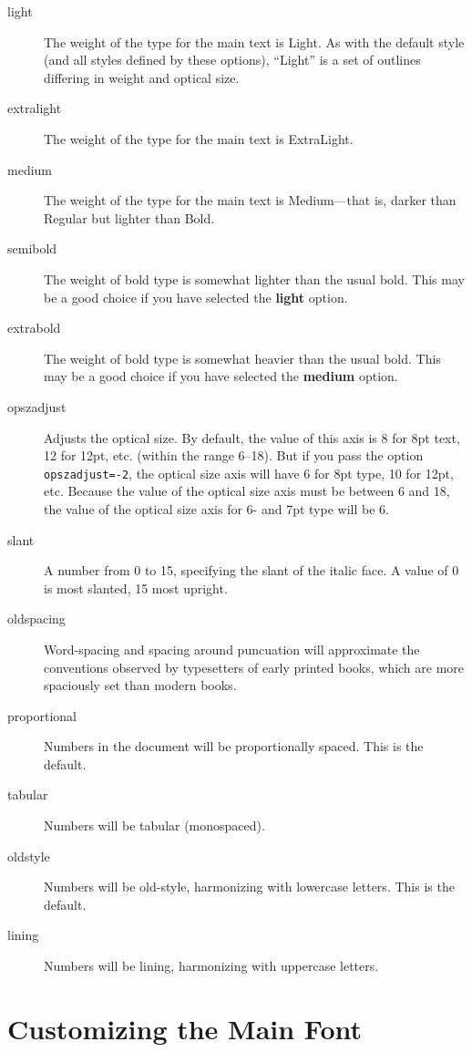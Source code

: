 \documentclass[12pt]{article}
\begin{document}
\begin{description}
    \item[light] The weight of the type for the main text is Light. As with the default
    style (and all styles defined by these options), “Light” is a set of outlines differing
    in weight and optical size.
    \item[extralight] The weight of the type for the main text is ExtraLight.
    \item[medium] The weight of the type for the main text is Medium---that is, darker than
    Regular but lighter than Bold.
    \item[semibold] The weight of bold type is somewhat lighter than the usual bold. This may be a
    good choice if you have selected the \textbf{light} option.
    \item[extrabold] The weight of bold type is somewhat heavier than the usual bold. This may be a
    good choice if you have selected the \textbf{medium} option.
    \item[opszadjust] Adjusts the optical size. By default, the value of this axis
    is 8 for 8pt text, 12 for 12pt, etc. (within the range 6–18). But if you pass the
    option {\color{BrickRed}\verb|opszadjust=-2|}, the optical size axis will have 6 for 8pt type, 10 for
    12pt, etc. Because the value of the optical size axis must be between 6 and 18, the
    value of the optical size axis for 6- and 7pt type will be 6.
    \item[slant] A number from 0 to 15, specifying the slant of the italic face.
    A value of 0 is {\mostslanted most slanted}, 15 {\leastslanted most upright}.
    \item[oldspacing] Word-spacing and spacing around puncuation will approximate the conventions
    observed by typesetters of early printed books, which are more spaciously set than
    modern books.
    \item[proportional] Numbers in the document will be proportionally spaced. This is the default.
    \item[tabular] Numbers will be tabular (monospaced).
    \item[oldstyle] Numbers will be old-style, harmonizing with lowercase letters. This is the default.
    \item[lining] Numbers will be lining, harmonizing with uppercase letters.
\end{description}

\section{Customizing the Main Font}
\end{document}
